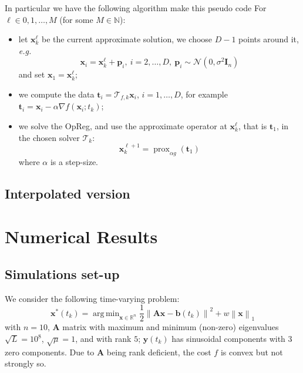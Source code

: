 \documentclass{article}
\DeclareMathOperator*{\argmin}{arg\,min}
\DeclareMathOperator{\prox}{prox}
\newcommand{\norm}[1]{\left\lVert#1\right\rVert}
\newcommand{\N}{\mathbb{N}}
\newcommand{\R}{\mathbb{R}}
\newcommand{\bv}{\mathbold{b}}
\newcommand{\p}{\mathbold{p}}
\newcommand{\tv}{\mathbold{t}}
\newcommand{\x}{\mathbold{x}}
\newcommand{\y}{\mathbold{y}}
\newcommand{\Am}{\mathbold{A}}
\renewcommand{\Im}{\mathbold{I}}
\newcommand{\T}{\mathcal{T}}
\newcommand{\nicola}[1]{{\color{blue}#1}}
\begin{document}
In particular we have the following algorithm \nicola{make this pseudo code}
For $\ell \in 0, 1, \ldots, M$ (for some $M \in \N$):
\begin{itemize}
	\item let $\x_k^\ell$ be the current approximate solution, we choose $D-1$ points around it, \emph{e.g.}
	$$
		\x_i = \x_k^\ell + \p_i, \ i = 2, \ldots, D, \ \p_i \sim \mathcal{N}(0, \sigma^2 \Im_n)
	$$
	and set $\x_1 = \x_k^\ell$;
	
	\item we compute the data $\tv_i = \T_{f,k} \x_i$, $i = 1, \ldots, D$, for example $\tv_i = \x_i - \alpha \nabla f(\x_i; t_k)$;
	
	\item we solve the OpReg, and use the approximate operator at $\x_k^\ell$, that is $\tv_1$, in the chosen solver $\T_k$:
	$$
		\x_k^{\ell+1} = \prox_{\alpha g}(\tv_1)
	$$
	where $\alpha$ is a step-size.
\end{itemize}


\subsection{Interpolated version}





\section{Numerical Results}\label{sec:numerical}


\subsection{Simulations set-up}
We consider the following time-varying problem:
\begin{equation}\label{eq:tv-problem}
	\x^*(t_k) = \argmin_{\x \in \R^n} \frac{1}{2} \norm{\Am \x - \bv(t_k)}^2 + w \norm{\x}_1
\end{equation}
with $n = 10$, $\Am$ matrix with maximum and minimum (non-zero) eigenvalues $\sqrt{L} = 10^8$, $\sqrt{\mu} = 1$, and with rank $5$; $\y(t_k)$ has sinusoidal components with $3$ zero components. Due to $\Am$ being rank deficient, the cost $f$ is convex but not strongly so.


\end{document}
